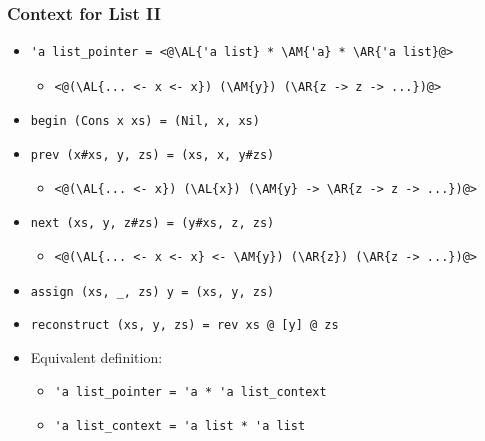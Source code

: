 \begin{frame}[fragile]
\frametitle{Context for List II}

\begin{itemize}[<+->]
\newcommand{\AL}[1]{\textcolor{red}{#1}}
\newcommand{\AM}[1]{\textcolor[RGB]{0,170,0}{#1}}
\newcommand{\AR}[1]{\textcolor{blue}{#1}}
\item
\begin{lstlisting}
'a list_pointer = <@\AL{'a list} * \AM{'a} * \AR{'a list}@>
\end{lstlisting}
\begin{itemize}
	\item
\begin{lstlisting}
<@(\AL{... <- x <- x}) (\AM{y}) (\AR{z -> z -> ...})@>
\end{lstlisting}
\end{itemize}

\item \lstinline.begin (Cons x xs) = (Nil, x, xs).

\item \lstinline.prev (x#xs, y, zs) = (xs, x, y#zs).
\begin{itemize}
	\item
\begin{lstlisting}
<@(\AL{... <- x}) (\AL{x}) (\AM{y} -> \AR{z -> z -> ...})@>
\end{lstlisting}
\end{itemize}

\item \lstinline.next (xs, y, z#zs) = (y#xs, z, zs).
\begin{itemize}
	\item
\begin{lstlisting}
<@(\AL{... <- x <- x} <- \AM{y}) (\AR{z}) (\AR{z -> ...})@>
\end{lstlisting}
\end{itemize}

\item \lstinline.assign (xs, _, zs) y = (xs, y, zs).

\item \lstinline.reconstruct (xs, y, zs) = rev xs @ [y] @ zs.

\item Equivalent definition:
\begin{itemize}
	\item \lstinline.'a list_pointer = 'a * 'a list_context.
	\item \lstinline.'a list_context = 'a list * 'a list.
\end{itemize}
\end{itemize}
\end{frame}

